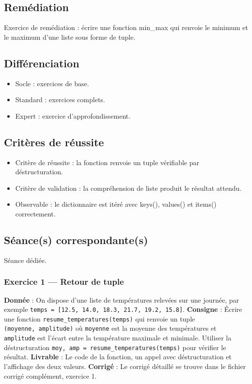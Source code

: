 \subsection{Remédiation}

Exercice de remédiation : écrire une fonction min\_max qui renvoie le
minimum et le maximum d'une liste sous forme de tuple.

\subsection{Différenciation}

\begin{itemize}
\tightlist
\item
  Socle : exercices de base.
\item
  Standard : exercices complets.
\item
  Expert : exercice d'approfondissement.
\end{itemize}

\subsection{Critères de réussite}

\begin{itemize}
\tightlist
\item
  Critère de réussite : la fonction renvoie un tuple vérifiable par
  déstructuration.
\item
  Critère de validation : la compréhension de liste produit le résultat
  attendu.
\item
  Observable : le dictionnaire est itéré avec keys(), values() et
  items() correctement.
\end{itemize}

\subsection{Séance(s) correspondante(s)}

Séance dédiée.

\subsubsection{Exercice 1 — Retour de tuple}

\textbf{Donnée} : On dispose d'une liste de températures relevées sur
une journée, par exemple
\texttt{temps\ =\ {[}12.5,\ 14.0,\ 18.3,\ 21.7,\ 19.2,\ 15.8{]}}.
\textbf{Consigne} : Écrire une fonction
\texttt{resume\_temperatures(temps)} qui renvoie un tuple
\texttt{(moyenne,\ amplitude)} où \texttt{moyenne} est la moyenne des
températures et \texttt{amplitude} est l'écart entre la température
maximale et minimale. Utiliser la déstructuration
\texttt{moy,\ amp\ =\ resume\_temperatures(temps)} pour vérifier le
résultat. \textbf{Livrable} : Le code de la fonction, un appel avec
déstructuration et l'affichage des deux valeurs. \textbf{Corrigé} : Le
corrigé détaillé se trouve dans le fichier corrigé complément, exercice
1.

